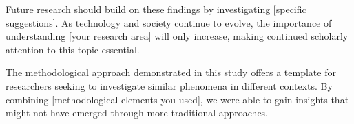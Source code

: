 \documentclass[11pt]{article}
\begin{document}
Future research should build on these findings by investigating [specific suggestions]. As technology and society continue to evolve, the importance of understanding [your research area] will only increase, making continued scholarly attention to this topic essential.

The methodological approach demonstrated in this study offers a template for researchers seeking to investigate similar phenomena in different contexts. By combining [methodological elements you used], we were able to gain insights that might not have emerged through more traditional approaches.

\clearpage



\end{document}
